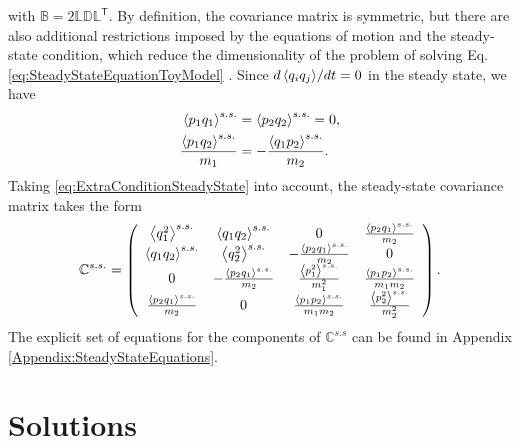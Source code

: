 %
with $\mathbb{B} = 2 \mathbb{L}\mathbb{D}\mathbb{L}^\mathsf{T}$. By definition, the covariance matrix is  symmetric, but there are also  additional restrictions imposed by the equations of motion and the steady-state condition, which reduce the dimensionality of the problem of solving Eq. \eqref{eq:SteadyStateEquationToyModel} \cite{Simon2019}. Since ${d \expval{ q_i q_j }}/{dt} = 0$ in the steady state, we have
%
\begin{align}
  \expval{ p_1 q_1}^{s.s.} &= \expval{ p_2 q_2}^{s.s.} = 0,\nonumber\\
  \frac{\expval{ p_1 q_2}^{s.s.}}{m_1}&=-\frac{\expval{ q_1 p_2}^{s.s.}}{m_2}.
  \label{eq:ExtraConditionSteadyState}
\end{align}
%
Taking \eqref{eq:ExtraConditionSteadyState} into account, the steady-state covariance matrix takes the form
%
\begin{equation}
  \begin{split}
    \mathbb{C}^{s.s.} =
    \left(
    \begin{array}{cccc}
      \expval{ q_1^2}^{s.s.}  & \expval{ q_1 q_2}^{s.s.}  & 0 & \frac{\expval{ p_2 q_1}^{s.s.} }{m_2} \\
      \expval{ q_1 q_2}^{s.s.}  & \expval{ q_2^2}^{s.s.}  & -\frac{\expval{ p_2 q_1}^{s.s.} }{m_2} & 0 \\
      0 & -\frac{\expval{ p_2 q_1}^{s.s.} }{m_2} & \frac{\expval{ p_1^2}^{s.s.} }{m_1^2} & \frac{\expval{ p_1 p_2}^{s.s.} }{m_1 m_2} \\
      \frac{\expval{ p_2 q_1}^{s.s.} }{m_2} & 0 & \frac{\expval{ p_1 p_2}^{s.s.} }{m_1 m_2} & \frac{\expval{ p_2^2}^{s.s.} }{m_2^2} \\
      \end{array}
      \right)
    \end{split}
    \label{eq:steadyStateCovarianceMatrix}\,.
\end{equation}
%
The explicit set of equations for the components of $\mathbb{C}^{s.s}$ can be found in Appendix \ref{Appendix:SteadyStateEquations}.
%
%
%
%
%
\section{Solutions\label{sec:solutions}}
%
%
%
%

